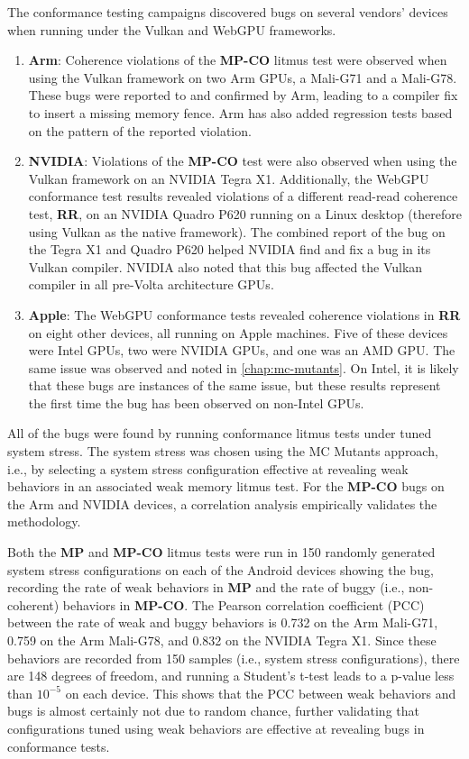 The conformance testing campaigns discovered bugs on several vendors' devices when running under the Vulkan and WebGPU frameworks.

\begin{enumerate}
    \item \textbf{Arm}: Coherence violations of the \textbf{MP-CO} litmus test were observed when using the Vulkan framework on two Arm GPUs, a Mali-G71 and a Mali-G78. These bugs were reported to and confirmed by Arm, leading to a compiler fix to insert a missing memory fence. Arm has also added regression tests based on the pattern of the reported violation.
    \item \textbf{NVIDIA}: Violations of the \textbf{MP-CO} test were also observed when using the Vulkan framework on an NVIDIA Tegra X1. Additionally, the WebGPU conformance test results revealed violations of a different read-read coherence test, \textbf{RR}, on an NVIDIA Quadro P620 running on a Linux desktop (therefore using Vulkan as the native framework). The combined report of the bug on the Tegra X1 and Quadro P620 helped NVIDIA find and fix a bug in its Vulkan compiler. NVIDIA also noted that this bug affected the Vulkan compiler in all pre-Volta architecture GPUs.
    \item \textbf{Apple}: The WebGPU conformance tests revealed coherence violations in \textbf{RR} on eight other devices, all running on Apple machines. Five of these devices were Intel GPUs, two were NVIDIA GPUs, and one was an AMD GPU. The same issue was observed and noted in \mychap\ref{chap:mc-mutants}. On Intel, it is likely that these bugs are instances of the same issue, but these results represent the first time the bug has been observed on non-Intel GPUs.
\end{enumerate}

All of the bugs were found by running conformance litmus tests under tuned system stress. The system stress was chosen using the MC Mutants approach, i.e., by selecting a system stress configuration effective at revealing weak behaviors in an associated weak memory litmus test. For the \textbf{MP-CO} bugs on the Arm and NVIDIA devices, a correlation analysis empirically validates the methodology.

Both the \textbf{MP} and \textbf{MP-CO} litmus tests were run in 150 randomly generated system stress configurations on each of the Android devices showing the bug, recording the rate of weak behaviors in \textbf{MP} and the rate of buggy (i.e., non-coherent) behaviors in \textbf{MP-CO}. The Pearson correlation coefficient (PCC) between the rate of weak and buggy behaviors is 0.732 on the Arm Mali-G71, 0.759 on the Arm Mali-G78, and 0.832 on the NVIDIA Tegra X1. Since these behaviors are recorded from 150 samples (i.e., system stress configurations), there are 148 degrees of freedom, and running a Student's t-test leads to a p-value less than $10^{-5}$ on each device. This shows that the PCC between weak behaviors and bugs is almost certainly not due to random chance, further validating that configurations tuned using weak behaviors are effective at revealing bugs in conformance tests.

